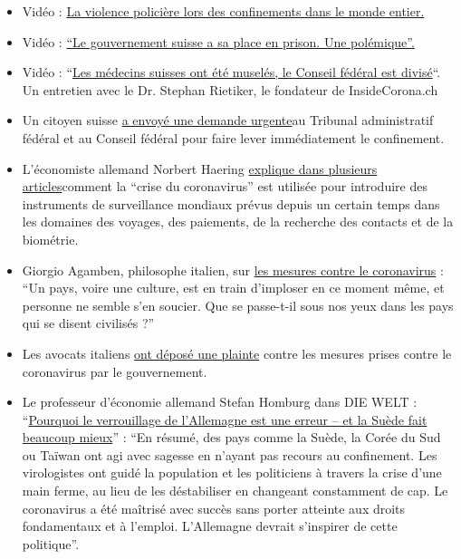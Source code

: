 \begin{itemize}
\tightlist
\item
  Vidéo : \href{https://www.youtube.com/watch?v=ZphK_CMUbKg}{La violence
  policière lors des confinements dans le monde entier.}
\item
  Vidéo : \href{https://www.youtube.com/watch?v=SO2JMkKtq40}{``Le
  gouvernement suisse a sa place en prison. Une polémique''.}
\item
  Vidéo : ``\href{https://www.youtube.com/watch?v=eU6IdglI-wc}{Les
  médecins suisses ont été muselés, le Conseil fédéral est divisé}``. Un
  entretien avec le Dr. Stephan Rietiker, le fondateur de
  InsideCorona.ch
\item
  Un citoyen suisse
  \href{https://faktenb-covid-19-massnahmen.jimdofree.com/}{a envoyé une
  demande urgente}au Tribunal administratif fédéral et au Conseil
  fédéral pour faire lever immédiatement le confinement.
\item
  L'économiste allemand Norbert Haering
  \href{https://norberthaering.de/}{explique dans plusieurs
  articles}comment la ``crise du coronavirus'' est utilisée pour
  introduire des instruments de surveillance mondiaux prévus depuis un
  certain temps dans les domaines des voyages, des paiements, de la
  recherche des contacts et de la biométrie.
\item
  Giorgio Agamben, philosophe italien, sur
  \href{https://www.nzz.ch/feuilleton/coronavirus-giorgio-agamben-zum-zusammenbruch-der-demokratie-ld.1551896}{les
  mesures contre le coronavirus} : ``Un pays, voire une culture, est en
  train d'imploser en ce moment même, et personne ne semble s'en
  soucier. Que se passe-t-il sous nos yeux dans les pays qui se disent
  civilisés ?''
\item
  Les avocats italiens
  \href{https://www.tvprato.it/2020/04/la-camera-civile-degli-avvocati-pratesi-chiede-lannullamento-del-dpcm-del-10-aprile-e-illegittimo/}{ont
  déposé une plainte} contre les mesures prises contre le coronavirus
  par le gouvernement.
\item
  Le professeur d'économie allemand Stefan Homburg dans DIE WELT :
  ``\href{https://www.msn.com/de-de/nachrichten/coronavirus/warum-deutschlands-lockdown-falsch-ist-\%E2\%80\%93-und-schweden-vieles-besser-macht/ar-BB12E6km}{Pourquoi
  le verrouillage de l'Allemagne est une erreur -- et la Suède fait
  beaucoup mieux}'' : ``En résumé, des pays comme la Suède, la Corée du
  Sud ou Taïwan ont agi avec sagesse en n'ayant pas recours au
  confinement. Les virologistes ont guidé la population et les
  politiciens à travers la crise d'une main ferme, au lieu de les
  déstabiliser en changeant constamment de cap. Le coronavirus a été
  maîtrisé avec succès sans porter atteinte aux droits fondamentaux et à
  l'emploi. L'Allemagne devrait s'inspirer de cette politique''.
\end{itemize}


